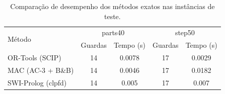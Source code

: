 \begin{table}[h]
\centering
\begin{tabular}{lcc|cc}
\hline
\multirow{2}{*}{Método} & \multicolumn{2}{c|}{parts40} & \multicolumn{2}{c}{step50} \\
 & Guardas & Tempo (s) & Guardas & Tempo (s) \\
\hline
OR-Tools (SCIP) & 14 & 0.0078 & 17 & 0.0029 \\
MAC (AC-3 + B\&B) & 14 & 0.0046 & 17 & 0.0182 \\
SWI-Prolog (clpfd) & 14 & 0.005 & 17 & 0.007 \\
\hline
\end{tabular}
\caption{Comparação de desempenho dos métodos exatos nas instâncias de teste.}
\label{tab:exact-methods}
\end{table}
